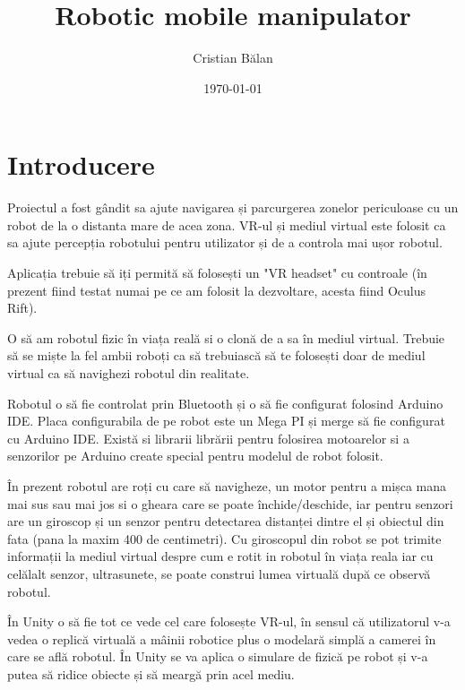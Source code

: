 \documentclass[12pt,a4paper]{article}
\title{\bf Robotic mobile manipulator}
\author{Cristian Bălan}
\date{\today}
\begin{document}
	\maketitle
	
	\pagebreak
	
	\tableofcontents
	
	\pagebreak
	
	\section{Introducere}
	
	\par Proiectul a fost gândit sa ajute navigarea și parcurgerea zonelor periculoase cu un robot de la o distanta mare de acea zona. VR-ul și mediul virtual este folosit ca sa ajute percepția robotului pentru utilizator și de a controla mai ușor robotul.
	
	\par Aplicația trebuie să iți permită să folosești un "VR headset" cu controale (în prezent fiind testat numai pe ce am folosit la dezvoltare, acesta fiind Oculus Rift). 
	
	\par O să am robotul fizic în viața reală si o clonă de a sa în mediul virtual. Trebuie să se miște la fel ambii roboți ca să trebuiască să te folosești doar de mediul virtual ca să navighezi robotul din realitate.
	
	\par Robotul o să fie controlat prin Bluetooth și o să fie configurat folosind Arduino IDE. Placa configurabila de pe robot este un Mega PI și merge să fie configurat cu Arduino IDE. Există si librarii librării pentru folosirea motoarelor si a senzorilor pe Arduino create special pentru modelul de robot folosit.
	
	\par În prezent robotul are roți cu care să navigheze, un motor pentru a mișca mana mai sus sau mai jos si o gheara care se poate închide/deschide, iar pentru senzori are un giroscop și un senzor pentru detectarea distanței dintre el și obiectul din fata (pana la maxim 400 de centimetri). Cu giroscopul din robot se pot trimite informații la mediul virtual despre cum e rotit in robotul în viața reala iar cu celălalt senzor, ultrasunete, se poate construi lumea virtuală după ce observă robotul.
	
	\par În Unity o să fie tot ce vede cel care folosește VR-ul, în sensul că utilizatorul v-a vedea o replică virtuală a mâinii robotice plus o modelară simplă a camerei în care se află robotul. În Unity se va aplica o simulare de fizică pe robot și v-a putea să ridice obiecte și să meargă prin acel mediu.
	
\end{document}

